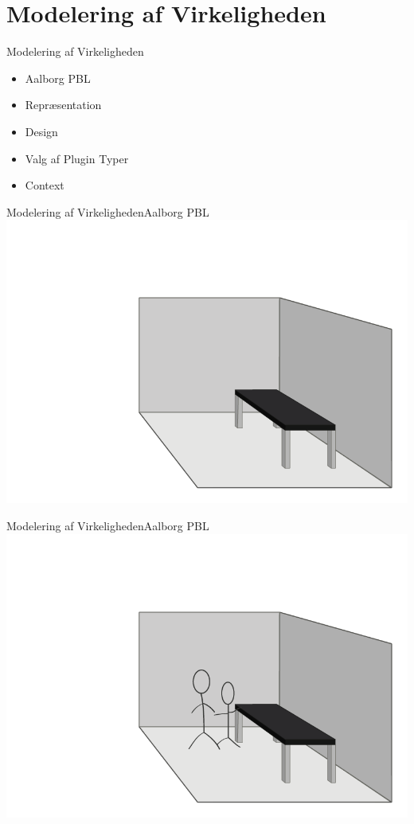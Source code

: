 \newcommand{\modelreality}{Modelering af Virkeligheden}
\newcommand{\topicone}{Aalborg PBL}
\newcommand{\topictwo}{Repr\ae{}sentation}
\newcommand{\topicthree}{Eksempel}
\newcommand{\topicfour}{Design}

\newcommand{\implementaras}{\modelreality}
\newcommand{\topictwoe}{Valg af Plugin Typer}
\newcommand{\topicthreee}{Context}

\section*{\modelreality}

\begin{frame}{\modelreality}
\begin{itemize}
	\item \topicone
  \item \topictwo
  \item \topicfour
	\item \topictwoe
	\item \topicthreee
\end{itemize}
\end{frame}
\begin{frame}{\modelreality}{\topicone} 
\includegraphics[width=\columnwidth]{input/rasmus/ras5.png}
\end{frame}
\begin{frame}{\modelreality}{\topicone} 
\includegraphics[width=\columnwidth]{input/rasmus/ras4.png}
\end{frame}
